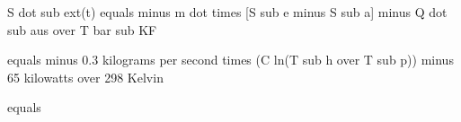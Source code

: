 S dot sub ext(t) equals minus m dot times [S sub e minus S sub a] minus Q dot sub aus over T bar sub KF

equals minus 0.3 kilograms per second times (C ln(T sub h over T sub p)) minus 65 kilowatts over 298 Kelvin

equals